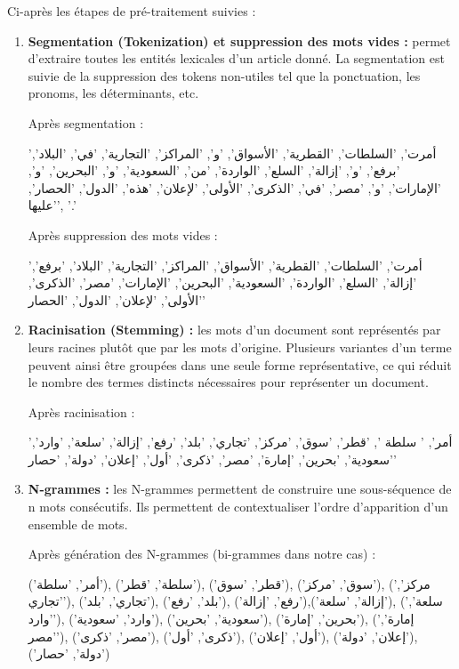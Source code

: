         Ci-après les étapes de pré-traitement suivies :
        \begin{enumerate}[leftmargin=*]
            \item{\textbf{Segmentation (Tokenization) et suppression des mots vides :} }permet d'extraire toutes les entités lexicales d'un article donné. La segmentation est suivie de la suppression des tokens non-utiles tel que la ponctuation, les pronoms, les déterminants, etc.

            Après segmentation : 
                \begin{arab}'أمرت', 'السلطات', 'القطرية', 'الأسواق', 'و', 'المراكز', 'التجارية', 'في', 'البلاد', 'برفع', 'و', 'إزالة', 'السلع', 'الواردة', 'من', 'السعودية', 'و', 'البحرين', 'و', 'الإمارات', 'و', 'مصر', 'في', 'الذكرى', 'الأولى', 'لإعلان', 'هذه', 'الدول', 'الحصار', 'عليها', '.'\end{arab}
            

            Après suppression des mots vides : 
            \begin{arab}'أمرت', 'السلطات', 'القطرية', 'الأسواق', 'المراكز', 'التجارية', 'البلاد', 'برفع', 'إزالة', 'السلع', 'الواردة', 'السعودية', 'البحرين', 'الإمارات', 'مصر', 'الذكرى', 'الأولى', 'لإعلان', 'الدول', 'الحصار'\end{arab}
            
            
            \item{\textbf{Racinisation (Stemming) :} }les mots d'un document sont représentés par leurs racines plutôt que par les mots d'origine. Plusieurs variantes d'un terme peuvent ainsi être groupées dans une seule forme représentative, ce qui réduit le nombre des termes distincts nécessaires pour représenter un document.

            Après racinisation : 
            \begin{arab}'أمر', ' سلطة ', 'قطر', 'سوق', 'مركز', 'تجاري', 'بلد', 'رفع', 'إزالة', 'سلعة', 'وارد', 'سعودية', 'بحرين', 'إمارة', 'مصر', 'ذكرى', 'أول', 'إعلان', 'دولة', 'حصار'\end{arab}
            

            \item{\textbf{N-grammes :} }les N-grammes permettent de construire une sous-séquence de n mots consécutifs. Ils permettent de contextualiser l'ordre d'apparition d'un ensemble de mots.

            Après génération des N-grammes (bi-grammes dans notre cas) : 
            \begin{arab}('أمر', 'سلطة'), ('سلطة', 'قطر'), ('قطر', 'سوق'), ('سوق', 'مركز'), ('مركز', 'تجاري'), ('تجاري', 'بلد'), ('بلد', 'رفع'), ('رفع', 'إزالة'),('إزالة', 'سلعة'), ('سلعة', 'وارد'), ('وارد', 'سعودية'), ('سعودية', 'بحرين'), ('بحرين', 'إمارة'), ('إمارة', 'مصر'), ('مصر', 'ذكرى'), ('ذكرى', 'أول'), ('أول', 'إعلان'), ('إعلان', 'دولة'), ('دولة', 'حصار')\end{arab}
            
        \end{enumerate}
